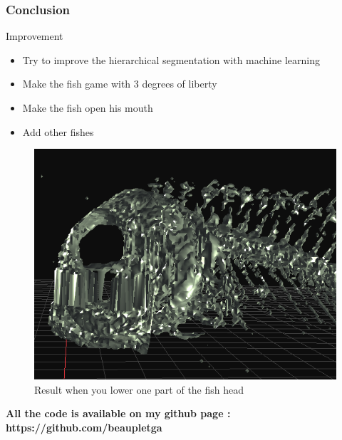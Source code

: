 \documentclass[9pt]{beamer}
\begin{document}
\begin{frame}
\frametitle{Conclusion}
\begin{block}{Improvement}
\begin{itemize}
\item Try to improve the hierarchical segmentation with machine learning
\item Make the fish game with 3 degrees of liberty
\item Make the fish open his mouth
\item Add other fishes
\end{itemize}
\end{block}
\begin{figure}
\includegraphics[scale=0.2]{Images/open_mouth}
\caption{Result when you lower one part of the fish head}
\end{figure}
\textbf{All the code is available on my github page : https://github.com/beaupletga
}\end{frame}
\end{document}
